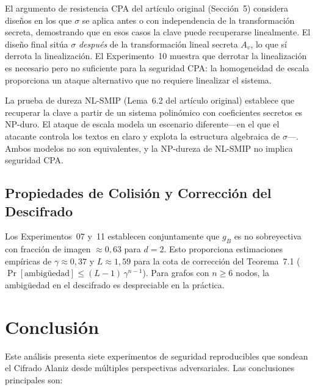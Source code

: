 \documentclass[12pt,a4paper]{article}
\theoremstyle{definition}
\begin{document}
El argumento de resistencia CPA del artículo original (Sección~5)
considera diseños en los que $\sigma$ se aplica antes o con
independencia de la transformación secreta, demostrando que en esos
casos la clave puede recuperarse linealmente. El diseño final sitúa
$\sigma$ \emph{después} de la transformación lineal secreta $A_v$,
lo que sí derrota la linealización. El Experimento~10 muestra que
derrotar la linealización es necesario pero no suficiente para la
seguridad CPA: la homogeneidad de escala proporciona un ataque
alternativo que no requiere linealizar el sistema.

La prueba de dureza NL-SMIP (Lema~6.2 del artículo original)
establece que recuperar la clave a partir de un sistema polinómico
con coeficientes secretos es NP-duro. El ataque de escala modela
un escenario diferente---en el que el atacante controla los textos
en claro y explota la estructura algebraica de $\sigma$---. Ambos
modelos no son equivalentes, y la NP-dureza de NL-SMIP no implica
seguridad CPA.

\subsection{Propiedades de Colisión y Corrección del Descifrado}

Los Experimentos~07 y~11 establecen conjuntamente que $g_B$ es no
sobreyectiva con fracción de imagen $\approx 0{,}63$ para $d = 2$.
Esto proporciona estimaciones empíricas de $\gamma \approx 0{,}37$
y $L \approx 1{,}59$ para la cota de corrección del Teorema~7.1
($\Pr[\text{ambigüedad}] \leq (L-1)\,\gamma^{n-1}$). Para grafos con
$n \geq 6$ nodos, la ambigüedad en el descifrado es despreciable en
la práctica.

\section{Conclusión}

Este análisis presenta siete experimentos de seguridad reproducibles
que sondean el Cifrado Alaniz desde múltiples perspectivas
adversariales. Las conclusiones principales son:
\end{document}

